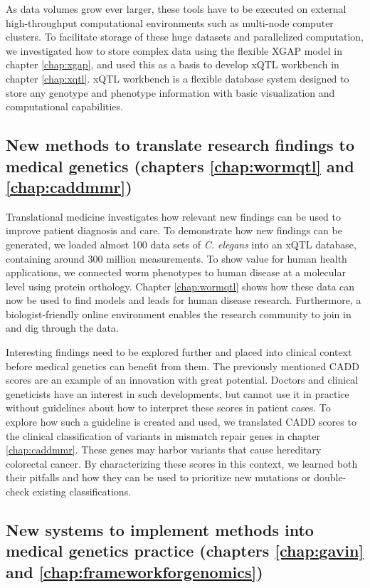 As data volumes grow ever larger, these tools have to be executed on external high-throughput computational environments such as multi-node computer clusters.
To facilitate storage of these huge datasets and parallelized computation, we investigated how to store complex data using the flexible XGAP model in chapter \ref{chap:xgap}, and used this as a basis to develop xQTL workbench in chapter \ref{chap:xqtl}.
xQTL workbench is a flexible database system designed to store any genotype and phenotype information with basic visualization and computational capabilities.

\subsection[New methods to translate research findings]{New methods to translate research findings to medical genetics (chapters \ref{chap:wormqtl} and \ref{chap:caddmmr})}

Translational medicine investigates how relevant new findings can be used to improve patient diagnosis and care.
To demonstrate how new findings can be generated, we loaded almost 100 data sets of \textsl{C. elegans} into an xQTL database, containing around 300 million measurements.
To show value for human health applications, we connected worm phenotypes to human disease at a molecular level using protein orthology.
Chapter \ref{chap:wormqtl} shows how these data can now be used to find models and leads for human disease research.
Furthermore, a biologist-friendly online environment enables the research community to join in and dig through the data.

Interesting findings need to be explored further and placed into clinical context before medical genetics can benefit from them.
The previously mentioned CADD scores\cite{Kircher_2014} are an example of an innovation with great potential.
Doctors and clinical geneticists have an interest in such developments, but cannot use it in practice without guidelines about how to interpret these scores in patient cases.
To explore how such a guideline is created and used, we translated CADD scores to the clinical classification of variants in mismatch repair genes in chapter \ref{chap:caddmmr}.
These genes may harbor variants that cause hereditary colorectal cancer.
By characterizing these scores in this context, we learned both their pitfalls and how they can be used to prioritize new mutations or double-check existing classifications.

\subsection[New systems for medical genetics practice]{New systems to implement methods into medical genetics practice (chapters \ref{chap:gavin} and \ref{chap:frameworkforgenomics})}

